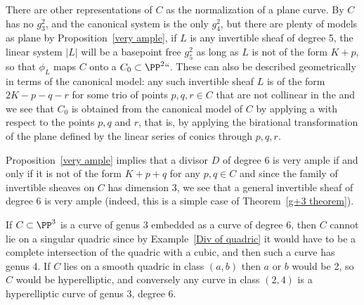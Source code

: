 There are other representations of $C$ as the normalization of a plane
curve. By
%
 $C$ has no $g^2_3$, and the canonical system
is the only $g^2_4$, but there are plenty of models as plane
by Proposition~\ref{very ample}, if $L$ is any invertible sheaf
of degree 5, the linear system $|L|$ will be a basepoint free $g^2_5$
as long as $L$ is not of the form $K+p$, so that $\phi_L$ maps $C$
%
onto a
%
$C_0 \subset \PP^2` `$. These can
also be described geometrically in terms of the canonical model: any
such invertible sheaf $L$ is of the form $2K-p-q-r$ for some trio of
points $p, q, r \in C$ that are not collinear in the
%
and we see  that $C_0$ is obtained from the canonical model of $C$ by
applying a
%
with respect to the points $p, q$ and $r$,
that is, by applying the birational transformation
of the plane defined by the linear series of conics through $p,q,r$.

Proposition~\ref{very ample} implies that a divisor $D$ of degree 6 is
very ample if and only if it is not of the form $K+p+q$ for any $p, q
\in C$ and since the family of invertible sheaves on $C$ has dimension 3,
we see that a general invertible sheaf of degree 6 is very ample (indeed,
this is a simple case of Theorem~\ref{g+3 theorem}).

If $C\subset \PP^3$ is a curve of genus 3 embedded as a curve of degree
6, then $C$ cannot lie on a singular quadric since by
Example~\ref{Div of quadric} it would
have to be a complete intersection of the quadric with a cubic, and then
such a curve has genus 4. If $C$ lies on a smooth quadric
in class $(a,b)$ then $a$ or $b$ would be 2, so $C$ would be
hyperelliptic, and conversely any curve in class $(2,4)$
is a hyperelliptic curve of genus 3, degree 6.

